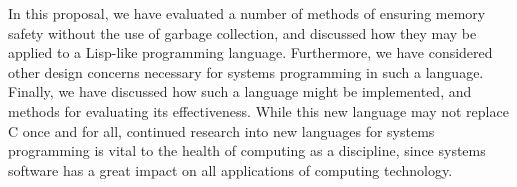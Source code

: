 \documentclass[11pt,draft]{article}
\theoremstyle{break}
\begin{document}
In this proposal, we have evaluated a number of methods of ensuring memory safety without the use of garbage collection, and discussed how they may be applied to a Lisp-like programming language. Furthermore, we have considered other design concerns necessary for systems programming in such a language. Finally, we have discussed how such a language might be implemented, and methods for evaluating its effectiveness. While this new language may not replace C once and for all, continued research into new languages for systems programming is vital to the health of computing as a discipline, since systems software has a great impact on all applications of computing technology.

\pagebreak
\printbibliography
\end{document}
